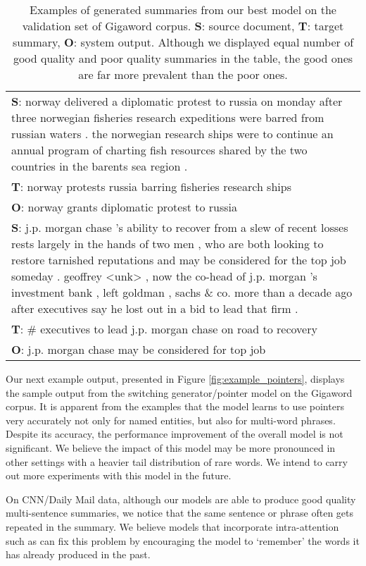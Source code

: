\documentclass[11pt]{article}
\begin{document}
\begin{table}
\begin{center}
{\begin{tabular}{|p{7.5cm}|}
\hline
{\bf S}: norway delivered a diplomatic protest to russia on monday after three norwegian fisheries research expeditions were barred from russian waters . the norwegian research ships were to continue an annual program of charting fish resources shared by the two countries in the barents sea region .\\
{\bf T}: norway protests russia barring fisheries research ships \\
{\bf O}: norway grants diplomatic protest to russia\\
\hline
{\bf S}: j.p. morgan chase 's ability to recover from a slew of recent losses rests largely in the hands of two men , who are both looking to restore tarnished reputations and may be considered for the top job someday .  geoffrey <unk> , now the co-head of j.p. morgan 's investment bank , left goldman , sachs \& co. more than a decade ago after executives say he lost out in a bid to lead that firm .\\
{\bf T}: \# executives to lead j.p. morgan chase on road to recovery \\
{\bf O}: j.p. morgan chase may be considered for top job \\
\hline
\end{tabular}
}
\end{center}
\caption{\label{fig:example_outputs} {\small Examples of generated summaries from our best model on the validation set of Gigaword corpus. {\bf S}: source document, {\bf T}: target summary, {\bf O}: system output. Although we displayed equal number of good quality and poor quality summaries in the table, the good ones are far more prevalent than the poor ones.}}
\vspace{-2mm}
\end{table}

Our next example output, presented in Figure \ref{fig:example_pointers}, displays the sample output from the switching generator/pointer model on the Gigaword corpus. It is apparent from the examples that the model learns to use pointers very accurately not only for named entities, but also for multi-word phrases. Despite its accuracy, the performance improvement of the overall model is not significant. We believe the impact of this model may be more pronounced in other settings with a heavier tail distribution of rare words. We intend to carry out more experiments with this model in the future.






On CNN/Daily Mail data, although our models are able to produce good quality multi-sentence summaries, we notice that the same sentence or phrase often gets repeated in the summary. We believe models that incorporate intra-attention such as  can fix this problem by encouraging the model to `remember' the words it has already produced in the past.
\end{document}

